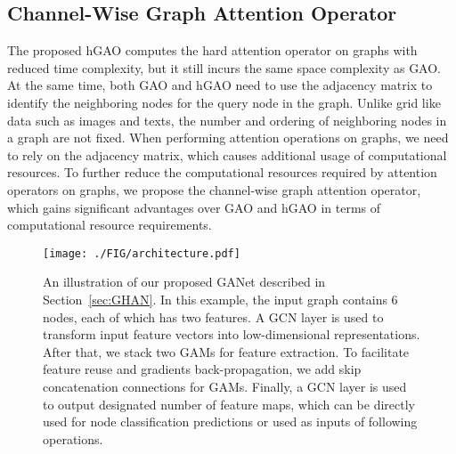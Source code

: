 \documentclass[sigconf]{acmart}
\begin{document}
\subsection{Channel-Wise Graph Attention Operator}

The proposed hGAO computes the hard attention operator on graphs
with reduced time complexity, but it still incurs the same space
complexity as GAO. At the same time, both GAO and hGAO need to use
the adjacency matrix to identify the neighboring nodes for the query
node in the graph. Unlike grid like data such as images and texts,
the number and ordering of neighboring nodes in a graph are not
fixed. When performing attention operations on graphs, we need to
rely on the adjacency matrix, which causes additional usage of
computational resources. To further reduce the computational
resources required by attention operators on graphs, we propose the
channel-wise graph attention operator, which gains significant
advantages over GAO and hGAO in terms of computational resource
requirements.

\begin{figure*}[t]
\texttt{[image: ./FIG/architecture.pdf]}
\caption{An illustration of our proposed GANet described in Section~\ref{sec:GHAN}.
In this example, the input graph contains 6 nodes, each of which has two features.
A GCN layer is used to transform input feature vectors into low-dimensional representations.
After that, we stack two GAMs for feature extraction. To facilitate feature reuse
and gradients back-propagation, we add skip concatenation connections for GAMs. Finally,
a GCN layer is used to output designated number of feature maps, which can be
directly used for node classification predictions or used as inputs of following operations.
} \label{fig:architecture}
\end{figure*}
\end{document}
